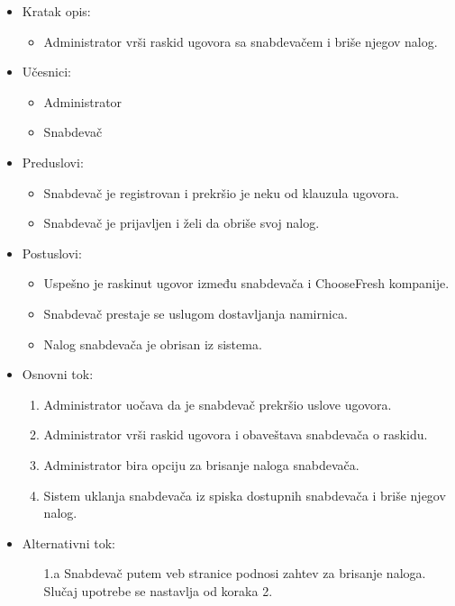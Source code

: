 
\begin{itemize}
    \item Kratak opis:
        \begin{itemize}
            \item Administrator vrši raskid ugovora sa snabdevačem i briše njegov nalog.
        \end{itemize}
    \item Učesnici:
        \begin{itemize}
            \item Administrator
            \item Snabdevač
        \end{itemize}
    \item Preduslovi:
        \begin{itemize}
            \item Snabdevač je registrovan i prekršio je neku od klauzula ugovora.
            \item Snabdevač je prijavljen i želi da obriše svoj nalog.
            
            
        \end{itemize}
    \item Postuslovi:
        \begin{itemize}
            \item Uspešno je raskinut ugovor između snabdevača i ChooseFresh kompanije.
            \item Snabdevač prestaje se uslugom dostavljanja namirnica.
            \item Nalog snabdevača je obrisan iz sistema.
        \end{itemize}
    \item Osnovni tok:
         \begin{enumerate}
            \item Administrator uočava da je snabdevač prekršio uslove ugovora.
            \item Administrator vrši raskid ugovora i obaveštava snabdevača o raskidu.
            \item Administrator bira opciju za brisanje naloga snabdevača.
            \item Sistem uklanja snabdevača iz spiska dostupnih snabdevača i briše njegov nalog.
        \end{enumerate}
    \item Alternativni tok:
        \begin{itemize}
            \item[1.a] Snabdevač putem veb stranice podnosi zahtev za brisanje naloga. Slučaj upotrebe se nastavlja od koraka 2.
        \end{itemize}
\end{itemize}

